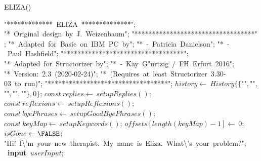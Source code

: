 \documentclass[a4paper,10pt]{article}
\begin{document}
\begin{algorithm}
\caption{ELIZA()}
\begin{algorithmic}[5]

\STATE {}
\STATE {}
\STATE {}
\STATE {}
\STATE {}
\STATE {}
\STATE {}
\STATE {}
\STATE {}
\STATE {}
\STATE {}
  \PRINT\(\)"{}*************\ ELIZA\ **************"{}\(\);
  \PRINT\(\)"{}*\ Original\ design\ by\ J.\ Weizenbaum"{}\(\);
  \PRINT\(\)"{}**********************************"{}\(\);
  \PRINT\(\)"{}*\ Adapted\ for\ Basic\ on\ IBM\ PC\ by"{}\(\);
  \PRINT\(\)"{}*\ -\ Patricia\ Danielson"{}\(\);
  \PRINT\(\)"{}*\ -\ Paul\ Hashfield"{}\(\);
  \PRINT\(\)"{}**********************************"{}\(\);
  \PRINT\(\)"{}*\ Adapted\ for\ Structorizer\ by"{}\(\);
  \PRINT\(\)"{}*\ -\ Kay\ G"urtzig\ /\ FH\ Erfurt\ 2016"{}\(\);
  \PRINT\(\)"{}*\ Version:\ 2.3\ (2020-02-24)"{}\(\);
  \PRINT\(\)"{}*\ (Requires\ at\ least\ Structorizer\ 3.30-03\ to\ run)"{}\(\);
  \PRINT\(\)"{}**********************************"{}\(\);
  \STATE {}
  \STATE {}
  \STATE \(history\gets\ History\{\{\)"{}"{}\(,\)"{}"{}\(,\)"{}"{}\(,\)"{}"{}\(,\)"{}"{}\(\},0\}\);
  \STATE \(const\ replies\gets\ setupReplies()\);
  \STATE \(const\ reflexions\gets\ setupReflexions()\);
  \STATE \(const\ byePhrases\gets\ setupGoodByePhrases()\);
  \STATE \(const\ keyMap\gets\ setupKeywords()\);
  \STATE \(offsets[length(keyMap)-1]\gets\ 0\);
  \STATE \(isGone\gets\FALSE\);
  \PRINT\(\)"{}Hi!\ I\textbackslash{}'{}m\ your\ new\ therapist.\ My\ name\ is\ Eliza.\ What\textbackslash{}'{}s\ your\ problem?"{}\(\);
  \REPEAT
    \STATE\ \textbf{input}\ \(userInput\);
    \STATE {}

\end{algorithmic}
\end{algorithm}
\end{document}
